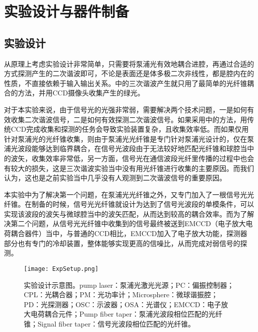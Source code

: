 \chapter{实验设计与器件制备}
\label{sec:fab}
\section{实验设计}
\label{sec:ExpSetup}

从原理上考虑实验设计非常简单，只需要将泵浦光有效地耦合进腔，再通过合适的方式探测产生的二次谐波即可，不论是表面还是体多极二次非线性，都是腔内在的性质，不直接依赖于输入输出关系。\cite{carmon2007visible}中的三次谐波产生就只用了最简单的光纤锥耦合的方法，并用CCD摄像头收集产生的绿光。

对于本实验来说，由于信号光的光强非常弱，需要解决两个技术问题，一是如何有效收集二次谐波信号，二是如何有效探测二次谐波信号。如果采用\cite{carmon2007visible}中的方法，用传统CCD完成收集和探测的任务会导致实验装置复杂，且收集效率低。而如果仅用针对泵浦光的光纤锥收集，则由于泵浦光光纤锥是专门针对泵浦光设计的，仅在泵浦光波段能够达到临界耦合，在信号光波段由于无法较好地匹配光纤锥和球腔当中的波矢，收集效率非常低，另一方面，信号光在通信波段光纤里传播的过程中也会有较大的损失，这是三次谐波实验当中没有用光纤锥进行收集的主要原因。而我们认为，这也是之前实验当中几乎没有人观测到二次谐波信号的重要原因。

本实验中为了解决第一个问题，在泵浦光光纤锥之外，又专门加入了一根信号光光纤锥。在制备的时候，信号光光纤锥就设计为达到了信号光波段的单模条件，可以实现该波段的波矢与微球腔当中的波矢匹配，从而达到较高的耦合效率。而为了解决第二个问题，从信号光光纤锥中收集到的信号最终被送到EMCCD（电子放大电荷耦合器件）当中，与普通的CCD相比，EMCCD加入了电子放大功能，探测器部分也有专门的冷却装置，整体能够实现更高的信噪比，从而完成对弱信号的探测。


\begin{figure}
\centering
\texttt{[image: ExpSetup.png]}
\caption{实验设计示意图。pump laser：泵浦光激光光源；PC：偏振控制器；CPL：光耦合器；PM：光功率计；Microsphere：微球谐振腔；PD：光探测器；OSC：示波器；OSA：光谱仪；EMCCD：电子放大电荷耦合元件；Pump fiber taper：泵浦光波段相位匹配的光纤锥；Signal fiber taper：信号光波段相位匹配的光纤锥。}
\label{pic:ExpSetup}
\end{figure}

